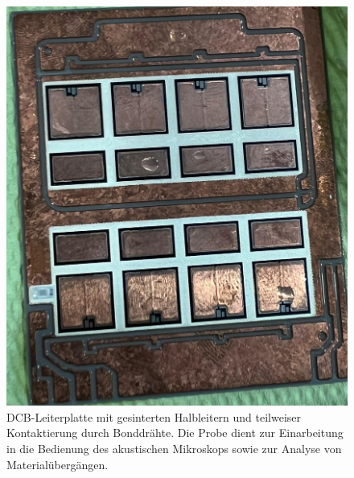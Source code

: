 \begin{figure}[htbp]
    \centering
    \includegraphics[scale=0.12]{Bilder/probe1}
    \caption{DCB-Leiterplatte mit gesinterten Halbleitern und teilweiser Kontaktierung durch Bonddrähte. Die Probe dient zur Einarbeitung in die Bedienung des akustischen Mikroskops sowie zur Analyse von Materialübergängen.}
    
    \vspace{0.2cm}
    \label{Abb.3: DCB-Leiterplatte mit gesinterten Halbleitern. Die Probe dient zur Einarbeitung in die Bedienung des akustischen Mikroskops sowie zur Analyse von Materialübergängen. }
\end{figure} 
\vspace{0.2cm}
